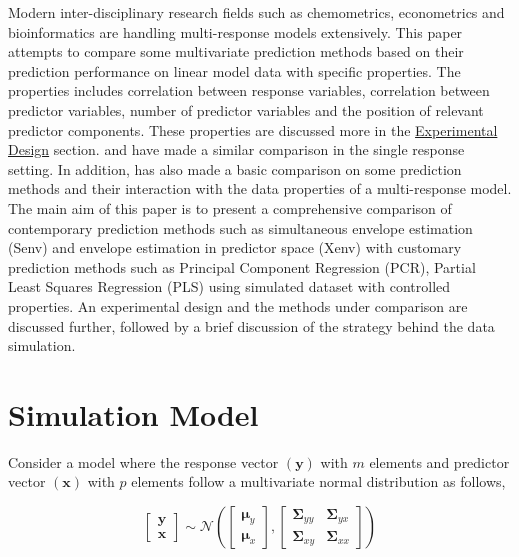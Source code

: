 \documentclass[12pt,3p,authoryear]{elsarticle}
\begin{document}
Modern inter-disciplinary research fields such as chemometrics,
econometrics and bioinformatics are handling multi-response models
extensively. This paper attempts to compare some multivariate prediction
methods based on their prediction performance on linear model data with
specific properties. The properties includes correlation between
response variables, correlation between predictor variables, number of
predictor variables and the position of relevant predictor components.
These properties are discussed more in the
\protect\hyperlink{experimental-design}{Experimental Design} section.
\citet{saebo2015simrel} and \citet{Alm_y_1996} have made a similar
comparison in the single response setting. In addition,
\citet{Rimal2018} has also made a basic comparison on some prediction
methods and their interaction with the data properties of a
multi-response model. The main aim of this paper is to present a
comprehensive comparison of contemporary prediction methods such as
simultaneous envelope estimation (Senv) \citep{cook2015simultaneous} and
envelope estimation in predictor space (Xenv) \citep{cook2010envelope}
with customary prediction methods such as Principal Component Regression
(PCR), Partial Least Squares Regression (PLS) using simulated dataset
with controlled properties. An experimental design and the methods under
comparison are discussed further, followed by a brief discussion of the
strategy behind the data simulation.

\section{Simulation Model}\label{simulation-model}

Consider a model where the response vector \((\mathbf{y})\) with \(m\)
elements and predictor vector \((\mathbf{x})\) with \(p\) elements
follow a multivariate normal distribution as follows,

\begin{equation}
  \begin{bmatrix}
    \mathbf{y} \\ \mathbf{x}
  \end{bmatrix} \sim \mathcal{N}
  \left(
    \begin{bmatrix}
      \boldsymbol{\mu}_y \\
      \boldsymbol{\mu}_x
    \end{bmatrix},
    \begin{bmatrix}
    \boldsymbol{\Sigma}_{yy} & \boldsymbol{\Sigma}_{yx} \\
    \boldsymbol{\Sigma}_{xy} & \boldsymbol{\Sigma}_{xx}
    \end{bmatrix}
  \right)
  \label{eq:model-1}
\end{equation}
\end{document}
